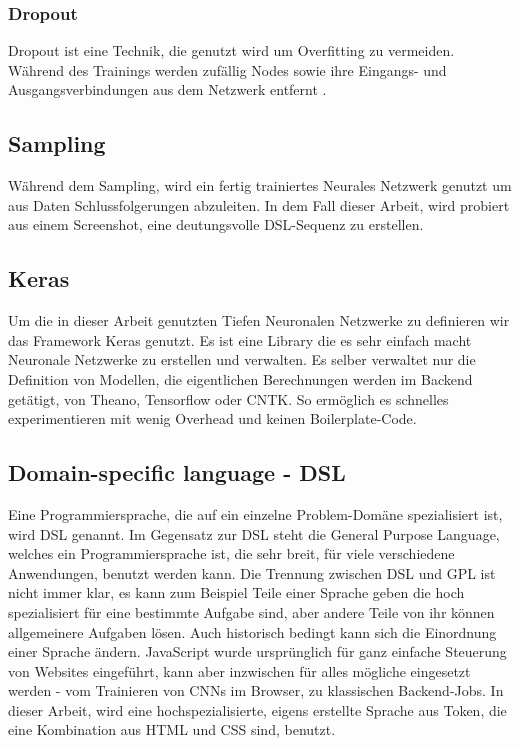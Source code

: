 \documentclass[pdftex,a4paper,halfparskip, article]{scrartcl}
\begin{document}
\subsubsection{Dropout}

Dropout ist eine Technik, die genutzt wird um Overfitting zu vermeiden. Während des Trainings werden zufällig Nodes sowie ihre Eingangs- und Ausgangsverbindungen aus dem Netzwerk entfernt \cite{JMLR:v15:srivastava14a}.


\subsection{Sampling}
Während dem Sampling, wird ein fertig trainiertes Neurales Netzwerk genutzt um aus Daten Schlussfolgerungen abzuleiten. In dem Fall dieser Arbeit, wird probiert aus einem Screenshot, eine deutungsvolle DSL-Sequenz zu erstellen.

\subsection{Keras}
Um die in dieser Arbeit genutzten Tiefen Neuronalen Netzwerke zu definieren wir das Framework Keras genutzt. Es ist eine Library die es sehr einfach macht Neuronale Netzwerke zu erstellen und verwalten. Es selber verwaltet nur die Definition von Modellen, die eigentlichen Berechnungen werden im Backend getätigt, von Theano, Tensorflow oder CNTK. So ermöglich es schnelles experimentieren mit wenig Overhead und keinen Boilerplate-Code. 

\subsection{Domain-specific language - DSL}

Eine Programmiersprache, die auf ein einzelne Problem-Domäne spezialisiert ist, wird DSL genannt. Im Gegensatz zur DSL steht die General Purpose Language, welches ein Programmiersprache ist, die sehr breit, für viele verschiedene Anwendungen, benutzt werden kann. Die Trennung zwischen DSL und GPL ist nicht immer klar, es kann zum Beispiel Teile einer Sprache geben die hoch spezialisiert für eine bestimmte Aufgabe sind, aber andere Teile von ihr können allgemeinere Aufgaben lösen. Auch historisch bedingt kann sich die Einordnung einer Sprache ändern. JavaScript wurde ursprünglich für ganz einfache Steuerung von Websites eingeführt, kann aber inzwischen für alles mögliche eingesetzt werden - vom Trainieren von CNNs im Browser, zu klassischen Backend-Jobs. 
In dieser Arbeit, wird eine hochspezialisierte, eigens erstellte Sprache aus Token, die eine Kombination aus HTML und CSS sind, benutzt.
\end{document}
